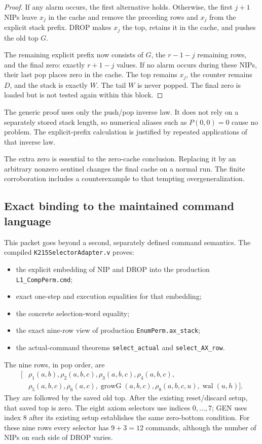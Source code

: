 \documentclass[11pt]{article}
\newcommand{\code}[1]{\texttt{#1}}
\theoremstyle{remark}
\begin{document}
\begin{proof}
If any alarm occurs, the first alternative holds. Otherwise, the first
\(j+1\) NIPs leave \(x_j\) in the cache and remove the preceding rows and
\(x_j\) from the explicit stack prefix. DROP makes \(x_j\) the top, retains
it in the cache, and pushes the old top \(G\).

The remaining explicit prefix now consists of \(G\), the \(r-1-j\)
remaining rows, and the final zero: exactly \(r+1-j\) values. If no alarm
occurs during these NIPs, their last pop places zero in the cache. The top
remains \(x_j\), the counter remains \(D\), and the stack is exactly \(W\).
The tail \(W\) is never popped. The final zero is loaded but is not tested
again within this block.
\end{proof}

The generic proof uses only the push/pop inverse law. It does not rely
on a separately stored stack length, so numerical aliases such as
\(P(0,0)=0\) cause no problem. The explicit-prefix calculation is justified
by repeated applications of that inverse law.

The extra zero is essential to the zero-cache conclusion. Replacing it by
an arbitrary nonzero sentinel changes the final cache on a normal run.
The finite corroboration includes a counterexample to that tempting
overgeneralization.

\subsection{Exact binding to the maintained command language}

This packet goes beyond a second, separately defined command semantics.
The compiled \code{K215SelectorAdapter.v} proves:
\begin{itemize}
\item the explicit embedding of NIP and DROP into the production
\code{L1\_CompPerm.cmd};
\item exact one-step and execution equalities for that embedding;
\item the concrete selection-word equality;
\item the exact nine-row view of production \code{EnumPerm.ax\_stack};
\item the actual-command theorems \code{select\_actual} and
\code{select\_AX\_row}.
\end{itemize}

The nine rows, in pop order, are
\[
\begin{aligned}
[&\rho_1(a,b),\rho_2(a,b,c),\rho_3(a,b,c),\rho_4(a,b,c),\\
 &\rho_5(a,b,c),\rho_6(a,c),\operatorname{growG}(a,b,c),
 \rho_8(a,b,c,u),\operatorname{wal}(u,h)].
\end{aligned}
\]
They are followed by the saved old top. After the existing reset/discard
setup, that saved top is zero. The eight axiom selectors use indices
\(0,\ldots,7\); GEN uses index 8 after its existing setup establishes the
same zero-bottom condition. For these nine rows every selector has
\(9+3=12\) commands, although the number of NIPs on each side of DROP varies.
\end{document}
